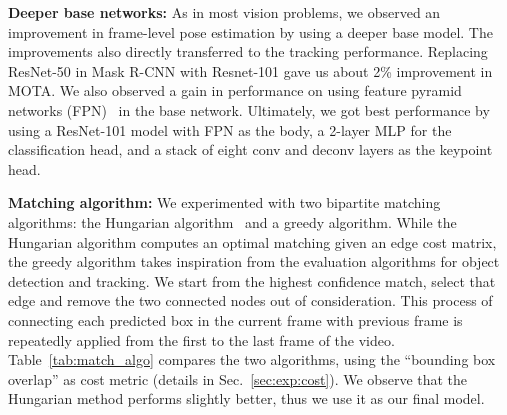 \documentclass[10pt,twocolumn,letterpaper]{article}
\newcommand{\tableSize}[0]{\small}
\begin{document}
{\noindent \bf Deeper base networks:}
As in most vision problems, we observed an improvement in frame-level pose estimation by using a deeper base model. The improvements also directly transferred to the tracking performance. Replacing ResNet-50 in Mask R-CNN with Resnet-101 gave us about 2\% improvement in MOTA. 
We also observed a gain in performance on using feature pyramid networks (FPN)~\cite{lin2017FPN} in the base network.
Ultimately, we got best performance by using a ResNet-101 model with FPN as the body,
a 2-layer MLP for the classification head, and a stack of eight conv and deconv layers as the keypoint head.


{\noindent \bf Matching algorithm:}\label{sec:exp:match-algo}
We experimented with two bipartite matching algorithms: the Hungarian algorithm~\cite{kuhn1955hungarian} and a greedy algorithm. While the Hungarian algorithm computes an optimal matching given an edge cost matrix, the greedy algorithm takes inspiration from the evaluation algorithms for object
detection and tracking. We start from the highest confidence match, select that edge and remove the two connected nodes out of consideration. This process of connecting each predicted box in the current frame with previous frame is repeatedly applied from the first to the last frame of the video. Table~\ref{tab:match_algo} compares the two algorithms, using the ``bounding box overlap'' as cost metric (details in Sec.~\ref{sec:exp:cost}). We observe that the Hungarian method performs slightly better, thus we use it as our final model.

\begin{table}[t]
  \tableSize{}
  \setlength\tabcolsep{1pt} 
  \begin{center}
  \end{center}
  \caption{{\bf Comparison between Hungarian and Greedy algorithm for matching}. Effect of matching algorithm in tracking performance, computed over the bounding-box overlap cost criterion. The hungarian algorithm obtains slightly higher performance than the simple greedy matching.
  }\label{tab:match_algo}
\end{table}
\end{document}
